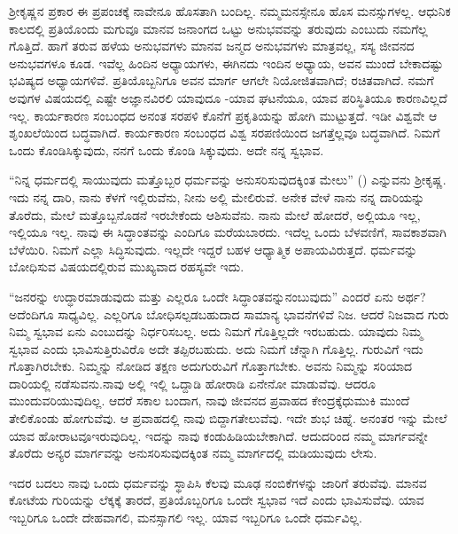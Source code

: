 ಶ‍್ರೀಕೃಷ್ಣನ ಪ್ರಕಾರ ಈ ಪ್ರಪಂಚಕ್ಕೆ ನಾವೇನೂ ಹೊಸತಾಗಿ ಬಂದಿಲ್ಲ. ನಮ್ಮ\break ಮನಸ್ಸೇನೂ ಹೊಸ ಮನಸ್ಸುಗಳಲ್ಲ. ಆಧುನಿಕ ಕಾಲದಲ್ಲಿ ಪ್ರತಿಯೊಂದು ಮಗುವೂ ಮಾನವ ಜನಾಂಗದ ಒಟ್ಟು ಅನುಭವವನ್ನು ತರುವುದು ಎಂಬುದು ನಮಗೆಲ್ಲ ಗೊತ್ತಿದೆ. ಹಾಗೆ ತರುವ ಹಳೆಯ ಅನುಭವಗಳು ಮಾನವ ಜನ್ಮದ ಅನುಭವಗಳು ಮಾತ್ರವಲ್ಲ, ಸಸ್ಯ ಜೀವನದ ಅನುಭವಗಳೂ ಕೂಡ. ಇವೆಲ್ಲ ಹಿಂದಿನ ಅಧ್ಯಾಯಗಳು, ಈಗಿನದು ಇಂದಿನ ಅಧ್ಯಾಯ, ಅವನ ಮುಂದೆ ಬೇಕಾದಷ್ಟು ಭವಿಷ್ಯದ ಅಧ್ಯಾಯಗಳಿವೆ. ಪ್ರತಿಯೊಬ್ಬನಿಗೂ ಅವನ ಮಾರ್ಗ ಆಗಲೇ ನಿಯೋಜಿತವಾಗಿದೆ; ರಚಿತವಾಗಿದೆ. ನಮಗೆ ಅವುಗಳ ವಿಷಯದಲ್ಲಿ ಎಷ್ಟೇ ಅಜ್ಞಾನವಿರಲಿ ಯಾವುದೂ -ಯಾವ ಘಟನೆಯೂ, ಯಾವ ಪರಿಸ್ಥಿತಿಯೂ ಕಾರಣವಿಲ್ಲದೆ ಇಲ್ಲ. ಕಾರ್ಯಕಾರಣ ಸಂಬಂಧದ ಅನಂತ ಸರಪಳಿ ಕೊನೆಗೆ ಪ್ರಕೃತಿಯನ್ನು ಹೋಗಿ ಮುಟ್ಟುತ್ತದೆ. ಇಡೀ ವಿಶ್ವವೇ ಆ ಶೃಂಖಲೆಯಿಂದ ಬದ್ಧವಾಗಿದೆ. ಕಾರ್ಯಕಾರಣ ಸಂಬಂಧದ ವಿಶ್ವ ಸರಪಣಿಯಿಂದ ಜಗತ್ತೆಲ್ಲವೂ ಬದ್ಧವಾಗಿದೆ. ನಿಮಗೆ ಒಂದು ಕೊಂಡಿ\break ಸಿಕ್ಕುವುದು, ನನಗೆ ಒಂದು ಕೊಂಡಿ ಸಿಕ್ಕುವುದು. ಅದೇ ನನ್ನ ಸ್ವಭಾವ.

“ನಿನ್ನ ಧರ್ಮದಲ್ಲಿ ಸಾಯುವುದು ಮತ್ತೊಬ್ಬರ ಧರ್ಮವನ್ನು ಅನುಸರಿಸುವುದಕ್ಕಿಂತ ಮೇಲು” () ಎನ್ನುವನು ಶ‍್ರೀಕೃಷ್ಣ. ಇದು ನನ್ನ ದಾರಿ, ನಾನು ಕೆಳಗೆ ಇಲ್ಲಿರುವೆನು, ನೀನು ಅಲ್ಲಿ ಮೇಲಿರುವೆ. ಅನೇಕ ವೇಳೆ ನಾನು ನನ್ನ ದಾರಿಯನ್ನು ತೊರೆದು, ಮೇಲೆ ಮತ್ತೊಬ್ಬನೊಡನೆ ಇರಬೇಕೆಂದು ಆಶಿಸುವೆನು. ನಾನು ಮೇಲೆ ಹೋದರೆ, ಅಲ್ಲಿಯೂ ಇಲ್ಲ, ಇಲ್ಲಿಯೂ ಇಲ್ಲ. ನಾವು ಈ ಸಿದ್ಧಾಂತವನ್ನು ಎಂದಿಗೂ ಮರೆಯಬಾರದು. ಇದೆಲ್ಲ ಒಂದು ಬೆಳವಣಿಗೆ, ಸಾವಕಾಶವಾಗಿ ಬೆಳೆಯಿರಿ. ನಿಮಗೆ ಎಲ್ಲಾ ಸಿದ್ಧಿಸುವುದು. ಇಲ್ಲದೇ ಇದ್ದರೆ ಬಹಳ ಆಧ್ಯಾತ್ಮಿಕ ಅಪಾಯವಿರುತ್ತದೆ. ಧರ್ಮವನ್ನು ಬೋಧಿಸುವ ವಿಷಯದಲ್ಲಿರುವ ಮುಖ್ಯವಾದ ರಹಸ್ಯವೇ ಇದು.

“ಜನರನ್ನು ಉದ್ಧಾರಮಾಡುವುದು ಮತ್ತು ಎಲ್ಲರೂ ಒಂದೇ ಸಿದ್ಧಾಂತವನ್ನು\break ನಂಬುವುದು” ಎಂದರೆ ಏನು ಅರ್ಥ? ಅದೆಂದಿಗೂ ಸಾಧ್ಯವಿಲ್ಲ. ಎಲ್ಲರಿಗೂ ಬೋಧಿಸಲ್ಪಡಬಹುದಾದ ಸಾಮಾನ್ಯ ಭಾವನೆಗಳಿವೆ ನಿಜ. ಆದರೆ ನಿಜವಾದ ಗುರು ನಿಮ್ಮ ಸ್ವಭಾವ ಏನು ಎಂಬುದನ್ನು ನಿರ್ಧರಿಸಬಲ್ಲ. ಅದು ನಿಮಗೆ ಗೊತ್ತಿಲ್ಲದೇ ಇರಬಹುದು. ಯಾವುದು ನಿಮ್ಮ ಸ್ವಭಾವ ಎಂದು ಭಾವಿಸುತ್ತಿರುವಿರೊ ಅದೇ ತಪ್ಪಿರಬಹುದು. ಅದು ನಿಮಗೆ ಚೆನ್ನಾಗಿ ಗೊತ್ತಿಲ್ಲ. ಗುರುವಿಗೆ ಇದು ಗೊತ್ತಾಗಿರಬೇಕು. ನಿಮ್ಮನ್ನು ನೋಡಿದ ತಕ್ಷಣ ಅದು\break ಗುರುವಿಗೆ ಗೊತ್ತಾಗಬೇಕು. ಅವನು ನಿಮ್ಮನ್ನು ಸರಿಯಾದ ದಾರಿಯಲ್ಲಿ ನಡೆಸುವನು.\break ನಾವು ಅಲ್ಲಿ ಇಲ್ಲಿ ಒದ್ದಾಡಿ ಹೋರಾಡಿ ಏನೇನೋ ಮಾಡುವೆವು. ಆದರೂ ಮುಂದುವರಿ\break ಯುವುದಿಲ್ಲ. ಆದರೆ ಸಕಾಲ ಬಂದಾಗ, ನಾವು ಜೀವನದ ಪ್ರವಾಹದ ಕೇಂದ್ರಕ್ಕೆ\break ಧುಮುಕಿ ಮುಂದೆ ತೇಲಿಕೊಂಡು ಹೋಗುವೆವು. ಆ ಪ್ರವಾಹದಲ್ಲಿ ನಾವು ಬಿದ್ದಾಗ\break ತೇಲುವೆವು. ಇದೇ ಶುಭ ಚಿಹ್ನೆ. ಅನಂತರ ಇನ್ನು ಮೇಲೆ ಯಾವ ಹೋರಾಟವೂ\break ಇರುವುದಿಲ್ಲ. ಇದನ್ನು ನಾವು ಕಂಡುಹಿಡಿಯಬೇಕಾಗಿದೆ. ಆದುದರಿಂದ ನಮ್ಮ ಮಾರ್ಗವನ್ನೇ ತೊರೆದು ಅನ್ಯರ ಮಾರ್ಗವನ್ನು ಅನುಸರಿಸುವುದಕ್ಕಿಂತ ನಮ್ಮ ಮಾರ್ಗದಲ್ಲಿ ಮಡಿಯುವುದು ಲೇಸು.

ಇದರ ಬದಲು ನಾವು ಒಂದು ಧರ್ಮವನ್ನು ಸ್ಥಾಪಿಸಿ ಕೆಲವು ಮೂಢ ನಂಬಿಕೆಗಳನ್ನು ಜಾರಿಗೆ ತರುವೆವು. ಮಾನವ ಕೋಟೆಯ ಗುರಿಯನ್ನು ಲೆಕ್ಕಕ್ಕೆ ತಾರದೆ, ಪ್ರತಿಯೊಬ್ಬರಿಗೂ ಒಂದೇ ಸ್ವಭಾವ ಇದೆ ಎಂದು ಭಾವಿಸುವೆವು. ಯಾವ ಇಬ್ಬರಿಗೂ ಒಂದೇ ದೇಹವಾಗಲಿ, ಮನಸ್ಸಾಗಲಿ ಇಲ್ಲ. ಯಾವ ಇಬ್ಬರಿಗೂ ಒಂದೇ ಧರ್ಮವಿಲ್ಲ.

